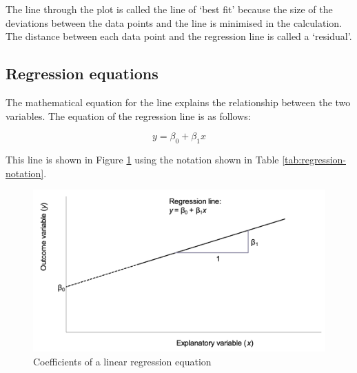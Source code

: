 \documentclass[
]{memoir}
\begin{document}
The line through the plot is called the line of `best fit' because the size of the deviations between the data points and the line is minimised in the calculation. The distance between each data point and the regression line is called a `residual'.

\hypertarget{regression-equations}{%
\subsection{Regression equations}\label{regression-equations}}

The mathematical equation for the line explains the relationship between the two variables. The equation of the regression line is as follows:

\[y = \beta_{0} + \beta_{1}x\]

This line is shown in Figure \ref{fig:regression-parameters} using the notation shown in Table \ref{tab:regression-notation}.

\begin{figure}
\includegraphics[width=0.66\linewidth]{img/mod08/regression-line-parameters} \caption{Coefficients of a linear regression equation}\label{fig:regression-parameters}
\end{figure}

 
  \providecommand{\huxb}[2]{\arrayrulecolor[RGB]{#1}\global\arrayrulewidth=#2pt}
  \providecommand{\huxvb}[2]{\color[RGB]{#1}\vrule width #2pt}
  \providecommand{\huxtpad}[1]{\rule{0pt}{#1}}
  \providecommand{\huxbpad}[1]{\rule[-#1]{0pt}{#1}}
\end{document}
